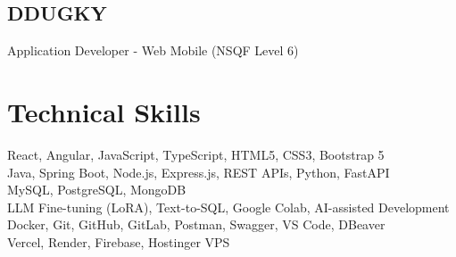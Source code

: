 \documentclass[11pt]{deedy-resume-openfont}
\renewcommand{\sectionsep}{\vspace{9pt}}
\begin{document}
\begin{minipage}[t]{0.33\textwidth}
\subsection{DDUGKY}
Application Developer - Web Mobile (NSQF Level 6)
\sectionsep


\section{Technical Skills}
React, Angular, JavaScript, TypeScript, HTML5, CSS3, Bootstrap 5 \\
Java, Spring Boot, Node.js, Express.js, REST APIs, Python, FastAPI \\
MySQL, PostgreSQL, MongoDB \\
LLM Fine-tuning (LoRA), Text-to-SQL, Google Colab, AI-assisted Development \\
Docker, Git, GitHub, GitLab, Postman, Swagger, VS Code, DBeaver \\
Vercel, Render, Firebase, Hostinger VPS
\sectionsep

\end{minipage}
\hfill
%
%
\end{document}
